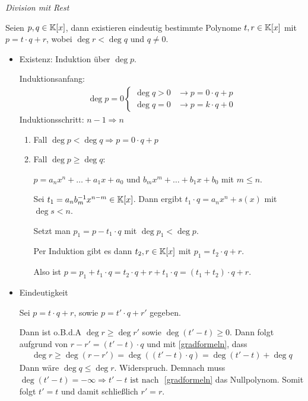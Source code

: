 \begin{mylemma}\label{divRestK[x]} \textit{Division mit Rest}

    Seien $p , q \in \mathbb{K}[x]$, dann existieren eindeutig bestimmte Polynome $t, r \in \mathbb{K}[x]$ mit $p = t \cdot q + r$, wobei $\deg r < \deg q$ und $q\neq0$.

    \begin{itemize}
        \item Existenz: Induktion über $\deg p$.

            Induktionsanfang:
            \begin{align*}
                \deg p = 0
                \begin{cases}
                    \deg q>0  & \rightarrow p=0\cdot q+p \\
                    \deg q=0  & \rightarrow p=k\cdot q+0
                \end{cases}
            \end{align*}
            Induktionsschritt: $n - 1 \Rightarrow n$
            \begin{enumerate}
                \item Fall $\deg p < \deg q \Rightarrow p = 0 \cdot q + p$
                \item Fall $\deg p \geq \deg q$:

                    $p = a_n x^n + \ldots + a_1 x + a_0$ und $b_m x^m + \ldots + b_1 x + b_0$ mit $m \leq n$.

                    Sei $t_1 = a_n b_m^{-1} x^{n-m} \in \mathbb{K}[x]$. Dann ergibt $t_1 \cdot q = a_n x^n + s(x)$ mit $\deg s<n$.

                    Setzt man $p_1 = p - t_1 \cdot q$ mit $\deg p_1 < \deg p$.

                    Per Induktion gibt es dann $t_2, r \in \mathbb{K}[x]$ mit $p_1 = t_2 \cdot q + r$.

                    Also ist $p = p_1 + t_1 \cdot q = t_2 \cdot q + r + t_1 \cdot q = (t_1 + t_2) \cdot q + r$.
            \end{enumerate}

        \item Eindeutigkeit

            Sei $p = t \cdot q + r$, sowie $p = t' \cdot q + r'$ gegeben.

            Dann ist o.B.d.A $\deg r \geq \deg r'$ sowie $\deg(t' - t) \geq 0$. Dann folgt aufgrund von $r - r' = (t' - t) \cdot q$ und mit \ref{gradformeln}, dass
            \begin{align*}
                \deg r \geq \deg(r - r') = \deg ((t' - t) \cdot q) = \deg(t' - t) + \deg q
            \end{align*}
            Dann wäre $\deg q \leq \deg r$. Widerspruch. Demnach muss $\deg(t' - t)= -\infty \Rightarrow t' - t \mbox{ ist nach }$ \ref{gradformeln} das Nullpolynom. Somit folgt $t' = t$ und damit schließlich $r' = r$.
    \end{itemize}
\end{mylemma}

